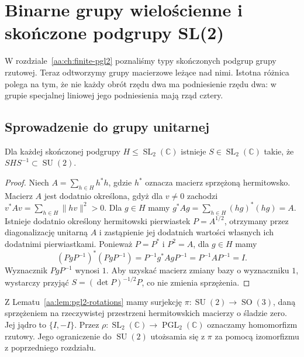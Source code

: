 \chapter{Binarne grupy wielościenne i skończone podgrupy SL(2)}
\label{aa:ch:binary-polyhedral}

\providecommand{\atlasref}[2]{#2}

W rozdziale~\ref{aa:ch:finite-pgl2} poznaliśmy typy
skończonych podgrup grupy rzutowej.
Teraz odtworzymy grupy macierzowe leżące nad nimi.
Istotna różnica polega na tym, że nie każdy obrót rzędu
dwa ma podniesienie rzędu dwa: w grupie specjalnej
liniowej jego podniesienia mają rząd cztery.

\section{Sprowadzenie do grupy unitarnej}

\begin{twierdzenie}
\label{aa:tw:binary-unitary}
Dla każdej skończonej podgrupy
$H\le\operatorname{SL}_2(\mathbb C)$ istnieje
$S\in\operatorname{SL}_2(\mathbb C)$ takie, że
$SHS^{-1}\subset\operatorname{SU}(2)$.
\end{twierdzenie}
\begin{proof}
Niech $A=\sum_{h\in H}h^*h$, gdzie $h^*$ oznacza
macierz sprzężoną hermitowsko. Macierz $A$ jest dodatnio
określona, gdyż dla $v\ne0$ zachodzi
$v^*Av=\sum_{h\in H}\|hv\|^2>0$.
Dla $g\in H$ mamy
$g^*Ag=\sum_{h\in H}(hg)^*(hg)=A$.
Istnieje dodatnio określony hermitowski pierwiastek
$P=A^{1/2}$, otrzymany przez diagonalizację unitarną
$A$ i zastąpienie jej dodatnich wartości własnych
ich dodatnimi pierwiastkami.
Ponieważ $P=P^*$ i $P^2=A$, dla $g\in H$ mamy
\[
 (PgP^{-1})^*(PgP^{-1})
 =P^{-1}g^*AgP^{-1}
 =P^{-1}AP^{-1}=I.
\]
Wyznacznik $PgP^{-1}$ wynosi $1$.
Aby uzyskać macierz zmiany bazy o wyznaczniku $1$,
wystarczy przyjąć $S=(\det P)^{-1/2}P$,
co nie zmienia sprzężenia.
\end{proof}

Z Lematu~\ref{aa:lem:pgl2-rotations} mamy surjekcję
$\pi:\operatorname{SU}(2)\to\operatorname{SO}(3)$,
daną sprzężeniem na rzeczywistej przestrzeni
hermitowskich macierzy o śladzie zero.
Jej jądro to $\{I,-I\}$.
Przez $\rho:\operatorname{SL}_2(\mathbb C)
\to\operatorname{PGL}_2(\mathbb C)$ oznaczamy
homomorfizm rzutowy. Jego ograniczenie do
$\operatorname{SU}(2)$ utożsamia się z $\pi$
za pomocą izomorfizmu z poprzedniego rozdziału.


